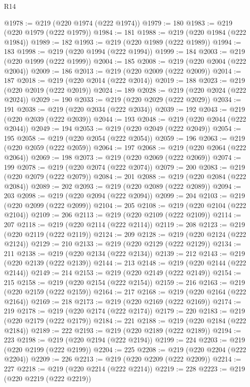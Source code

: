 \begin{lexlean}{R14}
\begin{coremodule}
@1978 := @219 (@220 @1974 (@222 @1974))
@1979 := 180
@1983 := @219 (@220 @1979 (@222 @1979))
@1984 := 181
@1988 := @219 (@220 @1984 (@222 @1984))
@1989 := 182
@1993 := @219 (@220 @1989 (@222 @1989))
@1994 := 183
@1998 := @219 (@220 @1994 (@222 @1994))
@1999 := 184
@2003 := @219 (@220 @1999 (@222 @1999))
@2004 := 185
@2008 := @219 (@220 @2004 (@222 @2004))
@2009 := 186
@2013 := @219 (@220 @2009 (@222 @2009))
@2014 := 187
@2018 := @219 (@220 @2014 (@222 @2014))
@2019 := 188
@2023 := @219 (@220 @2019 (@222 @2019))
@2024 := 189
@2028 := @219 (@220 @2024 (@222 @2024))
@2029 := 190
@2033 := @219 (@220 @2029 (@222 @2029))
@2034 := 191
@2038 := @219 (@220 @2034 (@222 @2034))
@2039 := 192
@2043 := @219 (@220 @2039 (@222 @2039))
@2044 := 193
@2048 := @219 (@220 @2044 (@222 @2044))
@2049 := 194
@2053 := @219 (@220 @2049 (@222 @2049))
@2054 := 195
@2058 := @219 (@220 @2054 (@222 @2054))
@2059 := 196
@2063 := @219 (@220 @2059 (@222 @2059))
@2064 := 197
@2068 := @219 (@220 @2064 (@222 @2064))
@2069 := 198
@2073 := @219 (@220 @2069 (@222 @2069))
@2074 := 199
@2078 := @219 (@220 @2074 (@222 @2074))
@2079 := 200
@2083 := @219 (@220 @2079 (@222 @2079))
@2084 := 201
@2088 := @219 (@220 @2084 (@222 @2084))
@2089 := 202
@2093 := @219 (@220 @2089 (@222 @2089))
@2094 := 203
@2098 := @219 (@220 @2094 (@222 @2094))
@2099 := 204
@2103 := @219 (@220 @2099 (@222 @2099))
@2104 := 205
@2108 := @219 (@220 @2104 (@222 @2104))
@2109 := 206
@2113 := @219 (@220 @2109 (@222 @2109))
@2114 := 207
@2118 := @219 (@220 @2114 (@222 @2114))
@2119 := 208
@2123 := @219 (@220 @2119 (@222 @2119))
@2124 := 209
@2128 := @219 (@220 @2124 (@222 @2124))
@2129 := 210
@2133 := @219 (@220 @2129 (@222 @2129))
@2134 := 211
@2138 := @219 (@220 @2134 (@222 @2134))
@2139 := 212
@2143 := @219 (@220 @2139 (@222 @2139))
@2144 := 213
@2148 := @219 (@220 @2144 (@222 @2144))
@2149 := 214
@2153 := @219 (@220 @2149 (@222 @2149))
@2154 := 215
@2158 := @219 (@220 @2154 (@222 @2154))
@2159 := 216
@2163 := @219 (@220 @2159 (@222 @2159))
@2164 := 217
@2168 := @219 (@220 @2164 (@222 @2164))
@2169 := 218
@2173 := @219 (@220 @2169 (@222 @2169))
@2174 := 219
@2178 := @219 (@220 @2174 (@222 @2174))
@2179 := 220
@2183 := @219 (@220 @2179 (@222 @2179))
@2184 := 221
@2188 := @219 (@220 @2184 (@222 @2184))
@2189 := 222
@2193 := @219 (@220 @2189 (@222 @2189))
@2194 := 223
@2198 := @219 (@220 @2194 (@222 @2194))
@2199 := 224
@2203 := @219 (@220 @2199 (@222 @2199))
@2204 := 225
@2208 := @219 (@220 @2204 (@222 @2204))
@2209 := 226
@2213 := @219 (@220 @2209 (@222 @2209))
@2214 := 227
@2218 := @219 (@220 @2214 (@222 @2214))
@2219 := 228
@2223 := @219 (@220 @2219 (@222 @2219))

\end{coremodule}
\end{lexlean}

